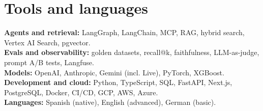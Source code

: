 \documentclass[a4paper,10pt]{article}
\begin{document}
\section*{Tools and languages}
\textbf{Agents and retrieval:} LangGraph, LangChain, MCP, RAG, hybrid search, Vertex AI Search, pgvector.\\
\textbf{Evals and observability:} golden datasets, recall@k, faithfulness, LLM-as-judge, prompt A/B tests, Langfuse.\\
\textbf{Models:} OpenAI, Anthropic, Gemini (incl. Live), PyTorch, XGBoost.\\
\textbf{Development and cloud:} Python, TypeScript, SQL, FastAPI, Next.js, PostgreSQL, Docker, CI/CD, GCP, AWS, Azure.\\
\textbf{Languages:} Spanish (native), English (advanced), German (basic).
\end{document}
